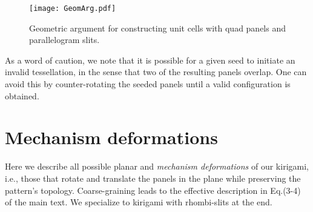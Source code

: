 \documentclass[aps,11pt,tightenlines,notitlepage,superscriptaddress,longbibliography,nofootinbib]{revtex4-1}
\begin{document}
\begin{figure}[h!]
\centering
\texttt{[image: GeomArg.pdf]}
\caption{Geometric argument for constructing unit cells with quad panels and parallelogram slits. }
\label{fig:GeomArg}
\end{figure}

As a word of caution, we note that it is possible for a given seed to initiate an invalid tessellation, in the sense that two of the resulting panels overlap. One can avoid this by counter-rotating the seeded panels until a valid configuration is obtained. %


\section{Mechanism deformations}\label{sec:KinAppend}

Here we  describe all possible planar and \textit{mechanism deformations} of our kirigami, i.e., those that  rotate and translate the panels in the plane while preserving the pattern's topology. Coarse-graining leads to the effective description in Eq.\;(3-4) of the main text. We specialize to kirigami with rhombi-slits at the end.
\end{document}
